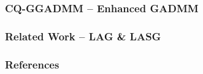
\begin{frame}
\frametitle{CQ-GGADMM -- Enhanced GADMM}



\end{frame}


\begin{frame}
\frametitle{Related Work -- LAG \& LASG}



\end{frame}


\begin{frame}[allowframebreaks]
\frametitle{References}

{\footnotesize


}

\end{frame}



